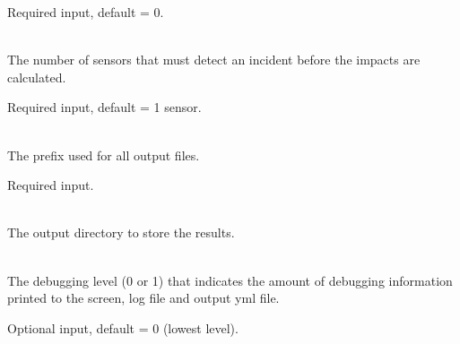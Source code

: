 \begin{description}[topsep=0pt,parsep=0.5em,itemsep=-0.4em]
\begin{description}[topsep=0pt,parsep=0.5em,itemsep=-0.4em]
                Required input, default = 0.
    \item[{detection confidence}]\hfill
\\The number of sensors that must detect an incident before
                the impacts are calculated.  
                
                Required input, default = 1 sensor.
  \end{description}
  \item[{configure}]\hfill
  \begin{description}[topsep=0pt,parsep=0.5em,itemsep=-0.4em]
    \item[{output prefix}]\hfill
\\The prefix used for all output files.
                
                Required input.
    \item[{output directory}]\hfill
      \\The output directory to store the results.
    \item[{debug}]\hfill
\\The debugging level (0 or 1) that indicates the amount of debugging 
                information printed to the screen, log file and output yml file. 
                
                Optional input, default = 0 (lowest level).
  \end{description}
\end{description}
